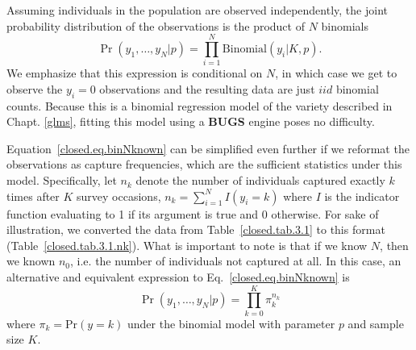 Assuming individuals in the population are observed independently, the
joint probability distribution of the observations is the product of
$N$ binomials
\begin{equation}
  \Pr(y_1, \ldots, y_N | p) = \prod_{i=1}^N  \mathrm{Binomial}(y_i | K, p).
  \label{closed.eq.binNknown}
\end{equation}
We emphasize that this expression is conditional on $N$, in which
case we get to observe the $y_i=0$ observations and the resulting data
are just $iid$ binomial counts. Because this is a binomial regression
model of the variety described in Chapt. \ref{glms}, fitting this model using
a {\bf BUGS} engine poses no difficulty.

Equation~\ref{closed.eq.binNknown} can be simplified even further if we reformat the
observations as capture frequencies, which are the sufficient
statistics under this model. Specifically, let $n_k$ denote the number
of individuals captured exactly $k$ times after $K$ survey occasions, $n_k = \sum_{i=1}^N
I(y_i = k)$ where $I$ is the indicator function evaluating to 1 if its
argument is true and 0 otherwise. For sake of illustration,
we converted the data from Table~\ref{closed.tab.3.1} to this
format (Table~\ref{closed.tab.3.1.nk}). What is important to note is
that if we know $N$, then we known $n_0$, i.e. the number of
individuals not captured at all. In this case, an alternative and equivalent expression to
Eq.~\ref{closed.eq.binNknown} is
\begin{equation}
  \Pr(y_1, \ldots, y_N | p) = \prod_{k=0}^K  \pi_{k}^{n_k}
  \label{closed.eq.multiNknown}
\end{equation}
where $\pi_{k} = \mathrm{Pr}(y=k)$ under the binomial model with
parameter $p$ and sample size $K$. 

